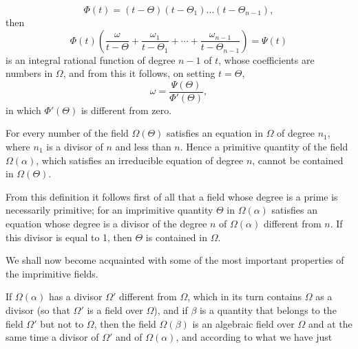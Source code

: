 \[
\Phi(t) = (t - \Theta)(t - \Theta_1) \ldots (t - \Theta_{n-1}),
\]
then
\[
\Phi(t) \left( \frac{\omega}{t - \Theta} + \frac{\omega_1}{t - \Theta_1} + \cdots + \frac{\omega_{n-1}}{t - \Theta_{n-1}} \right) = \Psi(t)
\]
is an integral rational function of degree $n - 1$ of $t$,
whose coefficients are numbers in $\Omega$, and from this it
follows, on setting $t = \Theta$,
\[
\omega = \frac{\Psi(\Theta)}{\Phi'(\Theta)},
\]
in which $\Phi'(\Theta)$ is different from zero.



For every number of the field $\Omega(\Theta)$ satisfies an equation
in $\Omega$ of degree $n_1$, where $n_1$ is a divisor of $n$ and
less than $n$. Hence a primitive quantity of the field
$\Omega(\alpha)$, which satisfies an irreducible equation of degree
$n$, cannot be contained in $\Omega(\Theta)$.


From this definition it follows first of all that a field whose
degree is a prime is necessarily primitive; for an imprimitive
quantity $\Theta$ in $\Omega(\alpha)$ satisfies an equation whose
degree is a divisor of the degree $n$ of $\Omega(\alpha)$ different
from $n$. If this divisor is equal to 1, then $\Theta$ is contained
in $\Omega$.

We shall now become acquainted with some of the most important
properties of the imprimitive fields.

If $\Omega(\alpha)$ has a divisor $\Omega'$ different from
$\Omega$, which in its turn contains $\Omega$ as a divisor (so that
$\Omega'$ is a field over $\Omega$), and if $\beta$ is a quantity that
belongs to the field $\Omega'$ but not to $\Omega$, then the
field $\Omega(\beta)$ is an algebraic field over $\Omega$ and
at the same time a divisor of $\Omega'$ and of $\Omega(\alpha)$, and
according to what we have just
